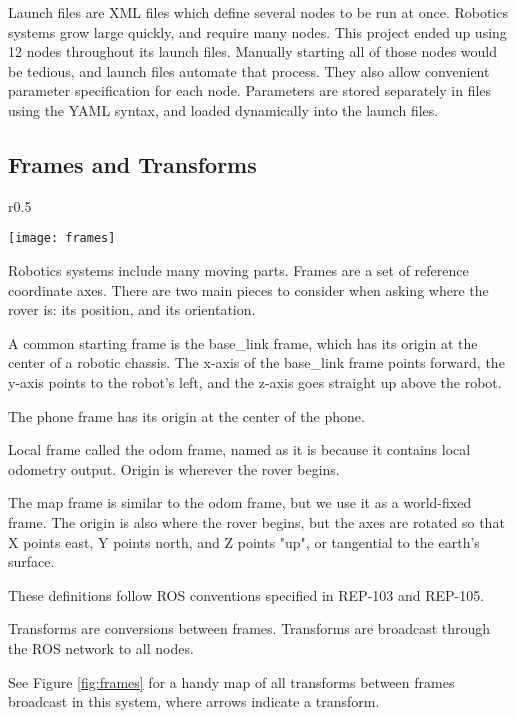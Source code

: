Launch files are XML files which define several nodes to be run at once. Robotics systems grow large quickly, and require many nodes. This project ended up using 12 nodes throughout its launch files. Manually starting all of those nodes would be tedious, and launch files automate that process. They also allow convenient parameter specification for each node. Parameters are stored separately in files using the YAML syntax, and loaded dynamically into the launch files.

\subsection{Frames and Transforms}

\begin{wrapfigure}{r}{0.5\textwidth}
	\caption{Frames}
	\centering
	\texttt{[image: frames]}
	\label{fig:frames}
\end{wrapfigure}

Robotics systems include many moving parts.
Frames are a set of reference coordinate axes.
There are two main pieces to consider when asking where the rover is: its position, and its orientation.

A common starting frame is the base\_link frame, which has its origin at the center of a robotic chassis. The x-axis of the base\_link frame points forward, the y-axis points to the robot's left, and the z-axis goes straight up above the robot.

The phone frame has its origin at the center of the phone.

Local frame called the odom frame, named as it is because it contains local odometry output. Origin is wherever the rover begins.

The map frame is similar to the odom frame, but we use it as a world-fixed frame. The origin is also where the rover begins, but the axes are rotated so that X points east, Y points north, and Z points "up", or tangential to the earth's surface. 


These definitions follow ROS conventions specified in REP-103 and REP-105. \cite{}

Transforms are conversions between frames.
Transforms are broadcast through the ROS network to all nodes. 

See Figure \ref{fig:frames} for a handy map of all transforms between frames broadcast in this system, where arrows indicate a transform.


